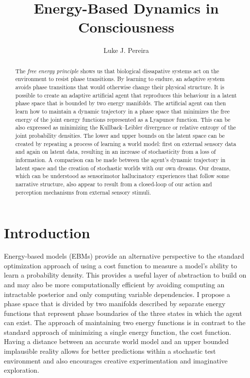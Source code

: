\documentclass{article}
\title{Energy-Based Dynamics in Consciousness}
\author{%
  Luke J. Pereira \\
}
\begin{document}
\maketitle
\vspace{-0.5cm}

\begin{abstract}
The \textit{free energy principle} shows us that biological dissapative systems act on the environment to resist phase transitions. By learning to endure, an adaptive system avoids phase transitions that would otherwise change their physical structure. It is possible to create an adaptive artificial agent that reproduces this behaviour in a latent phase space that is bounded by two energy manifolds. The artificial agent can then learn how to maintain a dynamic trajectory in a phase space that minimizes the free energy of the joint energy functions represented as a Lyapunov function. This can be also expressed as minimizing the Kullback–Leibler divergence or relative entropy of the joint probability densities. The lower and upper bounds on the latent space can be created by repeating a process of learning a world model: first on external sensory data and again on latent data, resulting in an increase of stochasticity from a loss of information. A comparison can be made between the agent's dynamic trajectory in latent space and the creation of stochastic worlds with our own dreams. Our dreams, which can be understood as sensorimotor hallucinatory experiences that follow some narrative structure, also appear to result from a closed-loop of our action and perception mechanisms from external sensory stimuli.
\end{abstract}

\begin{center}
    
\end{center}

\newpage

\section{Introduction}

Energy-based models (EBMs) provide an alternative perspective to the standard optimization approach of using a cost function to measure a model's ability to learn a probability density. This provides a useful layer of abstraction to build on and may also be more computationally efficient by avoiding computing an intractable posterior and only computing variable dependencies. I propose a phase space that is divided by two manifolds described by separate energy functions that represent phase boundaries of the three states in which the agent can exist. The approach of maintaining two energy functions is in contrast to the standard approach of minimizing a single energy function, the cost function. Having a distance between an accurate world model and an upper bounded implausible reality allows for better predictions within a stochastic test environment and also encourages creative experimentation and imaginative exploration. 
\end{document}
